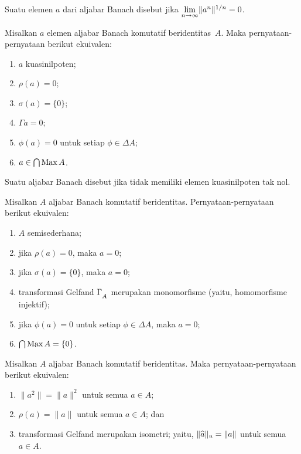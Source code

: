 \begin{defn} Suatu elemen $a$ dari aljabar Banach disebut
 jika $\lim\limits_{n \rightarrow \infty}\lVert a^n\rVert^{1/n} = 0$.
\end{defn}

\begin{prop} Misalkan $a$ elemen aljabar Banach komutatif beridentitas~$A$. Maka pernyataan-pernyataan
berikut ekuivalen:
  \begin{enumerate}[label=\rm{(\alph*)}]
   \item $a$ kuasinilpoten;
   \item $\rho(a) = 0$;
   \item $\sigma(a) = \{0\}$;
   \item $\Gamma a = 0$;
   \item $\phi(a) = 0$ untuk setiap $\phi \in \Delta A$;
   \item $a \in \bigcap\operatorname{Max} A$.
  \end{enumerate}
\end{prop}

\begin{defn} Suatu aljabar Banach disebut
 jika tidak memiliki elemen kuasinilpoten tak nol.
\end{defn}

\begin{prop} Misalkan $A$ aljabar Banach komutatif beridentitas. Pernyataan-pernyataan berikut ekuivalen:
  \begin{enumerate}[label=\rm{(\alph*)}]
   \item $A$ semisederhana;
   \item jika $\rho(a) = 0$, maka $a = 0$;
   \item jika $\sigma(a) = \{0\}$, maka $a = 0$;
   \item transformasi Gelfand $\Gamma_{{}_{\scriptstyle{A}}}$ merupakan monomorfisme (yaitu,
   homomorfisme injektif);
   \item jika $\phi(a) = 0$ untuk setiap $\phi \in \Delta A$, maka $a = 0$;
   \item $\bigcap\operatorname{Max} A = \{0\}$.
  \end{enumerate}
\end{prop}

\begin{prop}\label{00074083} Misalkan $A$ aljabar Banach komutatif beridentitas. Maka
pernyataan-pernyataan berikut ekuivalen:
  \begin{enumerate}[label=\rm{(\alph*)}]
    \item $\|a^2\| = \|a\|^2$ untuk semua $a \in A$;
    \item $\rho(a) = \|a\|$ untuk semua $a \in A$; dan
    \item transformasi Gelfand merupakan isometri; yaitu, $\lVert\widehat{a}\rVert_u = \|a\|$ untuk
    semua $a \in A$.
  \end{enumerate}
\end{prop}


